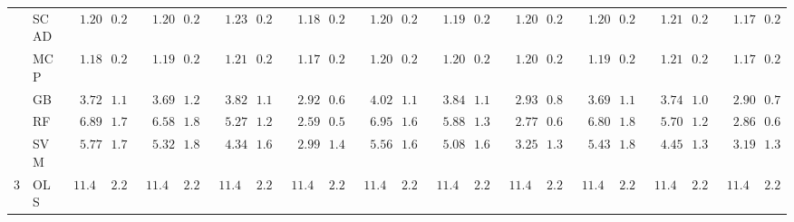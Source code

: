 \begin{tabular}{llllllllllllllllllllll}
	& SCAD  & $\phantom{00}1.200$ & $\phantom{0}0.249$ & $\phantom{00}1.207$ & $\phantom{0}0.262$ & $\phantom{00}1.230$ & $\phantom{0}0.256$ & $\phantom{00}1.185$ & $\phantom{0}0.257$ & $\phantom{00}1.201$ & $\phantom{0}0.274$ & $\phantom{00}1.196$ & $\phantom{0}0.249$ & $\phantom{00}1.201$ & $\phantom{0}0.249$ & $\phantom{00}1.205$ & $\phantom{0}0.254$ & $\phantom{00}1.219$ & $\phantom{0}0.254$ & $\phantom{00}1.174$ & $\phantom{0}0.262$ \\
	& MCP  & $\phantom{00}1.184$ & $\phantom{0}0.244$ & $\phantom{00}1.193$ & $\phantom{0}0.262$ & $\phantom{00}1.219$ & $\phantom{0}0.257$ & $\phantom{00}1.172$ & $\phantom{0}0.251$ & $\phantom{00}1.205$ & $\phantom{0}0.269$ & $\phantom{00}1.204$ & $\phantom{0}0.253$ & $\phantom{00}1.205$ & $\phantom{0}0.268$ & $\phantom{00}1.196$ & $\phantom{0}0.247$ & $\phantom{00}1.217$ & $\phantom{0}0.237$ & $\phantom{00}1.174$ & $\phantom{0}0.260$ \\
	& GB  & $\phantom{00}3.728$ & $\phantom{0}1.140$ & $\phantom{00}3.696$ & $\phantom{0}1.221$ & $\phantom{00}3.823$ & $\phantom{0}1.140$ & $\phantom{00}2.926$ & $\phantom{0}0.696$ & $\phantom{00}4.023$ & $\phantom{0}1.169$ & $\phantom{00}3.848$ & $\phantom{0}1.154$ & $\phantom{00}2.934$ & $\phantom{0}0.815$ & $\phantom{00}3.693$ & $\phantom{0}1.197$ & $\phantom{00}3.747$ & $\phantom{0}1.015$ & $\phantom{00}2.907$ & $\phantom{0}0.727$ \\
	& RF  & $\phantom{00}6.899$ & $\phantom{0}1.779$ & $\phantom{00}6.581$ & $\phantom{0}1.856$ & $\phantom{00}5.279$ & $\phantom{0}1.275$ & $\phantom{00}2.592$ & $\phantom{0}0.534$ & $\phantom{00}6.952$ & $\phantom{0}1.671$ & $\phantom{00}5.883$ & $\phantom{0}1.390$ & $\phantom{00}2.779$ & $\phantom{0}0.658$ & $\phantom{00}6.807$ & $\phantom{0}1.848$ & $\phantom{00}5.704$ & $\phantom{0}1.279$ & $\phantom{00}2.867$ & $\phantom{0}0.683$ \\
	& SVM  & $\phantom{00}5.770$ & $\phantom{0}1.710$ & $\phantom{00}5.321$ & $\phantom{0}1.816$ & $\phantom{00}4.345$ & $\phantom{0}1.686$ & $\phantom{00}2.991$ & $\phantom{0}1.473$ & $\phantom{00}5.567$ & $\phantom{0}1.619$ & $\phantom{00}5.084$ & $\phantom{0}1.606$ & $\phantom{00}3.257$ & $\phantom{0}1.327$ & $\phantom{00}5.438$ & $\phantom{0}1.818$ & $\phantom{00}4.451$ & $\phantom{0}1.332$ & $\phantom{00}3.194$ & $\phantom{0}1.313$ \\
	3 & OLS  & $\phantom{0}11.483$ & $\phantom{0}2.258$ & $\phantom{0}11.483$ & $\phantom{0}2.258$ & $\phantom{0}11.483$ & $\phantom{0}2.258$ & $\phantom{0}11.483$ & $\phantom{0}2.258$ & $\phantom{0}11.483$ & $\phantom{0}2.258$ & $\phantom{0}11.483$ & $\phantom{0}2.258$ & $\phantom{0}11.483$ & $\phantom{0}2.258$ & $\phantom{0}11.483$ & $\phantom{0}2.258$ & $\phantom{0}11.483$ & $\phantom{0}2.258$ & $\phantom{0}11.483$ & $\phantom{0}2.258$ \\

\end{tabular}
